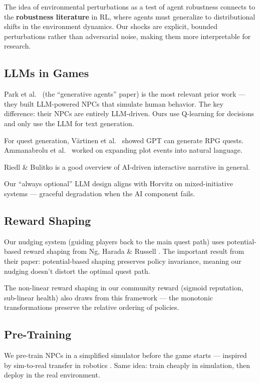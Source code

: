 The idea of environmental perturbations as a test of agent robustness connects to the \textbf{robustness literature} in RL, where agents must generalize to distributional shifts in the environment dynamics. Our shocks are explicit, bounded perturbations rather than adversarial noise, making them more interpretable for research.

\subsection{LLMs in Games}

Park et al.\ \cite{park2023generative} (the ``generative agents'' paper) is the most relevant prior work --- they built LLM-powered NPCs that simulate human behavior. The key difference: their NPCs are entirely LLM-driven. Ours use Q-learning for decisions and only use the LLM for text generation.

For quest generation, V\"{a}rtinen et al.\ \cite{vartinen2022quests} showed GPT can generate RPG quests. Ammanabrolu et al.\ \cite{ammanabrolu2020story} worked on expanding plot events into natural language.

Riedl \& Bulitko \cite{riedl2013interactive} is a good overview of AI-driven interactive narrative in general.

Our ``always optional'' LLM design aligns with Horvitz \cite{horvitz1999mixed} on mixed-initiative systems --- graceful degradation when the AI component fails.

\subsection{Reward Shaping}

Our nudging system (guiding players back to the main quest path) uses potential-based reward shaping from Ng, Harada \& Russell \cite{ng1999reward}. The important result from their paper: potential-based shaping preserves policy invariance, meaning our nudging doesn't distort the optimal quest path.

The non-linear reward shaping in our community reward (sigmoid reputation, sub-linear health) also draws from this framework --- the monotonic transformations preserve the relative ordering of policies.

\subsection{Pre-Training}

We pre-train NPCs in a simplified simulator before the game starts --- inspired by sim-to-real transfer in robotics \cite{tobin2017sim2real}. Same idea: train cheaply in simulation, then deploy in the real environment.
